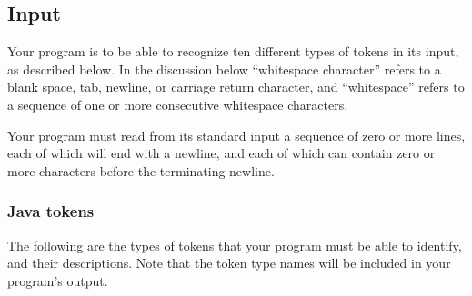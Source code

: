 \documentclass[11pt]{article}
\begin{document}
    \subsection{Input}

      Your program is to be able to recognize ten different types of tokens in
    its input, as described below.  In the discussion below ``whitespace
    character'' refers to a blank space, tab, newline, or carriage return
    character, and ``whitespace'' refers to a sequence of one or more
    consecutive whitespace characters.

      Your program must read from its standard input a sequence of zero or
    more lines, each of which will end with a newline, and each of which can
    contain zero or more characters before the terminating newline.

      \subsubsection{Java tokens}

        The following are the types of tokens that your program must be able
      to identify, and their descriptions.  Note that the token type names
      will be included in your program's output.
\end{document}
